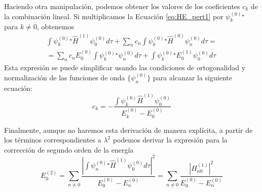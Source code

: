 \documentclass{tufte-handout}
\begin{document}
Haciendo otra manipulación, podemos obtener los valores de los 
coeficientes $c_k$ de la combinación lineal. Si multiplicamos la
Ecuación \ref{eq:HE_pert1} por $\psi_k^{(0)}^\star$ para $k\neq 0$,
obtenemos
\begin{equation}
    \begin{split}
        \int \psi_k^{(0)}^\star \hat{H}^{(1)}\psi_0^{(0)}d\tau +  \sum_nc_n\int \psi_k^{(0)}^\star\hat{H}^{(0)}\psi_n^{(0)}d\tau = \\
    = \sum_nc_nE_0^{(0)}\int \psi_k^{(0)}^\star\psi_n^{(0)}d\tau + \int \psi_k^{(0)}^\star E_0^{(1)}\psi_0^{(0)}d\tau
    \end{split}
\end{equation}
Esta expresión se puede simplificar usando las condiciones de
ortogonalidad y normalización de las funciones de onda 
$\{\psi_n^{(0)}\}$ para alcanzar la siguiente ecuación:
\begin{equation}
    c_k=-\frac{\int \psi_k^{(0)}\hat{H}^{(1)}\psi_0^{(0)}}{E_k^{(0)} - E_0^{(0)}}
\end{equation}

Finalmente, aunque no haremos esta derivación de manera explícita,
a partir de los términos correspondientes a $\lambda^2$
podemos derivar la expresión para la corrección de segundo orden de
la energía
\begin{equation}
    E_0^{(2)} = \sum_{n\neq 0}\frac{|\int\psi_n^{(0)}^\star\hat{H}^{(1)}\psi_0^{(0)}d\tau|^2}{E_0^{(0)} - E_n^{(0)}} = 
    \sum_{n\neq 0}\frac{|H_{n0}^{(1)}|^2}{E_0^{(0)} - E_n^{(0)}}
\end{equation}
\end{document}
